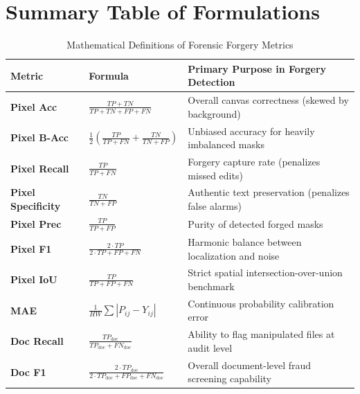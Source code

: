 \documentclass[11pt,a4paper]{article}
\begin{document}
\section{Summary Table of Formulations}
\begin{table}[htbp]
\centering
\small
\caption{Mathematical Definitions of Forensic Forgery Metrics}
\label{tab:metric_defs}
\begin{tabular}{lll}
\toprule
\textbf{Metric} & \textbf{Formula} & \textbf{Primary Purpose in Forgery Detection} \\
\midrule
\textbf{Pixel Acc} & $\frac{TP + TN}{TP + TN + FP + FN}$ & Overall canvas correctness (skewed by background) \\
\textbf{Pixel B-Acc} & $\frac{1}{2}\left(\frac{TP}{TP+FN} + \frac{TN}{TN+FP}\right)$ & Unbiased accuracy for heavily imbalanced masks \\
\textbf{Pixel Recall} & $\frac{TP}{TP + FN}$ & Forgery capture rate (penalizes missed edits) \\
\textbf{Pixel Specificity} & $\frac{TN}{TN + FP}$ & Authentic text preservation (penalizes false alarms) \\
\textbf{Pixel Prec} & $\frac{TP}{TP + FP}$ & Purity of detected forged masks \\
\textbf{Pixel F1} & $\frac{2 \cdot TP}{2 \cdot TP + FP + FN}$ & Harmonic balance between localization and noise \\
\textbf{Pixel IoU} & $\frac{TP}{TP + FP + FN}$ & Strict spatial intersection-over-union benchmark \\
\textbf{MAE} & $\frac{1}{HW}\sum |P_{ij} - Y_{ij}|$ & Continuous probability calibration error \\
\textbf{Doc Recall} & $\frac{TP_{\text{doc}}}{TP_{\text{doc}} + FN_{\text{doc}}}$ & Ability to flag manipulated files at audit level \\
\textbf{Doc F1} & $\frac{2 \cdot TP_{\text{doc}}}{2 \cdot TP_{\text{doc}} + FP_{\text{doc}} + FN_{\text{doc}}}$ & Overall document-level fraud screening capability \\
\bottomrule
\end{tabular}
\end{table}
\end{document}

